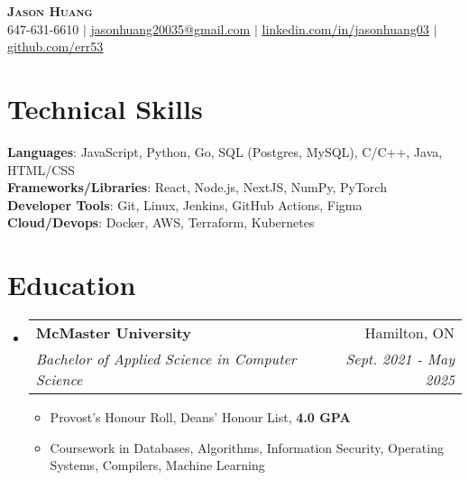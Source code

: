 \documentclass[letterpaper,11pt]{article}
\makeatletter
\newcommand{\resumeItem}[1]{
  \item\small{
    {#1 \vspace{-2pt}}
  }
}
\newcommand{\resumeSubheading}[4]{
  \vspace{-2pt}\item
    \begin{tabular*}{0.97\textwidth}[t]{l@{\extracolsep{\fill}}r}
      \textbf{#1} & #2 \\
      \textit{\small#3} & \textit{\small #4} \\
    \end{tabular*}\vspace{-7pt}
}
\newcommand{\resumeSubHeadingListStart}{\begin{itemize}[leftmargin=0.15in, label={}]}
\newcommand{\resumeSubHeadingListEnd}{\end{itemize}}
\newcommand{\resumeItemListStart}{\begin{itemize}}
\newcommand{\resumeItemListEnd}{\end{itemize}\vspace{-5pt}}
\makeatother
\begin{document}

\begin{center}
    \textbf{\Huge \scshape Jason Huang} \\ \vspace{1pt}
    \small 647-631-6610 $|$ \href{mailto:jasonhuang20035@gmail.com}{\underline{jasonhuang20035@gmail.com}} $|$ 
    \href{https://www.linkedin.com/in/jasonhuang03/}{\underline{linkedin.com/in/jasonhuang03}} $|$
    \href{http://github.com/err53}{\underline{github.com/err53}}
\end{center}

%
\section{Technical Skills}
 \begin{itemize}[leftmargin=0.15in, label={}]
    \small{\item{
     \textbf{Languages}{: JavaScript, Python, Go, SQL (Postgres, MySQL), C/C++, Java, HTML/CSS} \\
     \textbf{Frameworks/Libraries}{: React, Node.js, NextJS, NumPy, PyTorch} \\
     \textbf{Developer Tools}{: Git, Linux, Jenkins, GitHub Actions, Figma} \\
     \textbf{Cloud/Devops}{: Docker, AWS, Terraform, Kubernetes} \\
    }}
 \end{itemize}

\section{Education}
  \resumeSubHeadingListStart
    \resumeSubheading
      {McMaster University}{Hamilton, ON}
      {Bachelor of Applied Science in Computer Science}{Sept. 2021 - May 2025}
    \resumeItemListStart
      \resumeItem{Provost's Honour Roll, Deans' Honour List, \textbf{4.0 GPA}}
      \resumeItem{Coursework in Databases, Algorithms, Information Security, Operating Systems, Compilers, Machine Learning}
    \resumeItemListEnd
  \resumeSubHeadingListEnd
\end{document}
